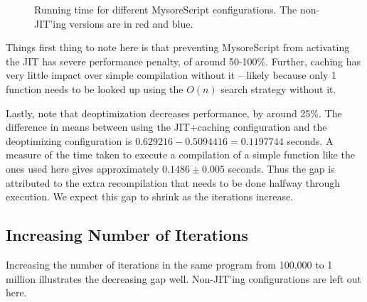 \documentclass[journal,comsoc]{IEEEtran}
\begin{document}
	\begin{figure}[htb]

	\caption{Running time for different MysoreScript configurations. The non-JIT'ing versions are in red and blue.}
		\label{fig:100kbase}
	\end{figure}
	
	Things first thing to note here is that preventing MysoreScript from activating the JIT has severe performance penalty, of around 50-100\%. Further, caching has very little impact over simple compilation without it -- likely because only 1 function needs to be looked up using the $O(n)$ search strategy without it.
	
	Lastly, note that deoptimization decreases performance, by around 25\%. The difference in means between using the JIT+caching configuration and the deoptimizing configuration is $0.629216 - 0.5094416 = 0.1197744$ seconds. A measure of the time taken to execute a compilation of a simple function like the ones used here gives approximately $0.1486
	\pm0.005$ seconds. Thus the gap is attributed to the extra recompilation that needs to be done halfway through execution. We expect this gap to shrink as the iterations increase.

	
	\subsection{Increasing Number of Iterations}
	Increasing the number of iterations in the same program from 100,000 to 1 million illustrates the decreasing gap well. Non-JIT'ing configurations are left out here.
	
\end{document}
